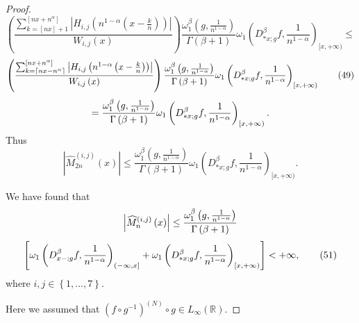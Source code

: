 \documentclass[10pt]{NSP1}
\numberwithin{equation}{section}
\begin{document}
\begin{proof}
\begin{equation}
\end{equation}
\begin{equation*}
\left( \frac{\sum_{k=\left[ nx\right] +1}^{\left[ nx+n^{\alpha }\right]
}\left \vert H_{i,j}\left( n^{1-\alpha }\left( x-\frac{k}{n}\right) \right)
\right \vert }{W_{i,j}\left( x\right) }\right) \frac{\omega _{1}^{\beta
}\left( g,\frac{1}{n^{1-\alpha }}\right) }{\Gamma \left( \beta +1\right) }%
\omega _{1}\left( D_{\ast x;g}^{\beta }f,\frac{1}{n^{1-\alpha }}\right)
_{[x,+\infty )}\leq
\end{equation*}
\begin{equation}
\left( \frac{\sum_{k=\left \lceil nx-n^{\alpha }\right \rceil }^{\left[
nx+n^{\alpha }\right] }\left \vert H_{i,j}\left( n^{1-\alpha }\left( x-\frac{%
k}{n}\right) \right) \right \vert }{W_{i,j}\left( x\right) }\right) \frac{%
\omega _{1}^{\beta }\left( g,\frac{1}{n^{1-\alpha }}\right) }{\Gamma \left(
\beta +1\right) }\omega _{1}\left( D_{\ast x;g}^{\beta }f,\frac{1}{%
n^{1-\alpha }}\right) _{[x,+\infty )}  \tag{49}  \label{49}
\end{equation}
\begin{equation*}
=\frac{\omega _{1}^{\beta }\left( g,\frac{1}{n^{1-\alpha }}\right) }{\Gamma
\left( \beta +1\right) }\omega _{1}\left( D_{\ast x;g}^{\beta }f,\frac{1}{%
n^{1-\alpha }}\right) _{[x,+\infty )}.
\end{equation*}
Thus
\begin{equation}
\left \vert \widehat{M}_{2n}^{\left( i,j\right) }\left( x\right) \right
\vert \leq \frac{\omega _{1}^{\beta }\left( g,\frac{1}{n^{1-\alpha }}\right)
}{\Gamma \left( \beta +1\right) }\omega _{1}\left( D_{\ast x;g}^{\beta }f,%
\frac{1}{n^{1-\alpha }}\right) _{[x,+\infty )}.  \tag{50}  \label{50}
\end{equation}

We have found that
\begin{equation*}
\left \vert \widehat{M}_{n}^{\left( i,j\right) }\left( x\right) \right \vert
\leq \frac{\omega _{1}^{\beta }\left( g,\frac{1}{n^{1-\alpha }}\right) }{%
\Gamma \left( \beta +1\right) }
\end{equation*}
\begin{equation}
\left[ \omega _{1}\left( D_{x-;g}^{\beta }f,\frac{1}{n^{1-\alpha }}\right)
_{(-\infty ,x]}+\omega _{1}\left( D_{\ast x;g}^{\beta }f,\frac{1}{%
n^{1-\alpha }}\right) _{[x,+\infty )}\right] <+\infty ,  \tag{51}  \label{51}
\end{equation}
where $i,j\in \left \{ 1,...,7\right \} .$

Here we assumed that $\left( f\circ g^{-1}\right) ^{\left( N\right) }\circ
g\in L_{\infty }\left( \mathbb{R}\right) .$


\end{proof}
\end{document}
